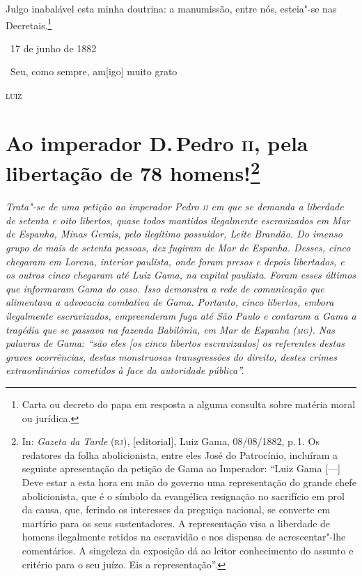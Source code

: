 Julgo inabalável esta minha doutrina: a manumissão, entre nós, esteia"-se
nas Decretais.\footnote{Carta ou decreto do papa em resposta a alguma
  consulta sobre matéria moral ou jurídica.}

\hfill\ 17 de junho de 1882\smallskip

\hfill\ Seu, como sempre, am{[}igo{]} muito grato

\hfill\textsc{luiz}

\chapter{Ao imperador D.\,Pedro \textsc{ii}, pela libertação de 78 homens!\footnote[*]{In:
  \emph{Gazeta da Tarde} (\textsc{rj}), {[}editorial{]}, Luiz Gama, 08/08/1882,
  p.\,1. Os redatores da folha abolicionista, entre eles José do
  Patrocínio, incluíram a seguinte apresentação da petição de Gama ao
  Imperador: ``Luiz Gama {[}---{]} Deve estar a esta hora em mão do
  governo uma representação do grande chefe abolicionista, que é o
  símbolo da evangélica resignação no sacrifício em prol da causa, que,
  ferindo os interesses da preguiça nacional, se converte em martírio
  para os seus sustentadores.
  A representação visa a liberdade de homens ilegalmente retidos na
  escravidão e nos dispensa de acrescentar"-lhe comentários.
  A singeleza da exposição dá ao leitor conhecimento do assunto e
  critério para o seu juízo.
  Eis a representação''.}} %

\begin{flushleft}
{\footnotesize\itshape
Trata"-se de uma petição ao imperador Pedro \textsc{ii} em que se demanda a
liberdade de setenta e oito libertos, quase todos mantidos
ilegalmente escravizados em Mar de Espanha, Minas Gerais, pelo ilegítimo
possuidor, Leite Brandão. Do imenso grupo de mais de setenta pessoas,
dez fugiram de Mar de Espanha. Desses, cinco chegaram em Lorena,
interior paulista, onde foram presos e depois libertados, e os
outros cinco chegaram até Luiz Gama, na capital paulista. Foram esses
últimos que informaram Gama do caso. Isso demonstra a rede de comunicação que alimentava a
advocacia combativa de Gama. Portanto, cinco libertos, embora
ilegalmente escravizados, empreenderam fuga até São Paulo e contaram a
Gama a tragédia que se passava na fazenda Babilônia, em Mar de Espanha
(\textsc{mg}). Nas palavras de Gama: ``são eles {[}os cinco libertos
escravizados{]} os referentes destas graves ocorrências, destas
monstruosas transgressões do direito, destes crimes extraordinários
cometidos à face da autoridade pública''. }
\end{flushleft}\pagebreak

